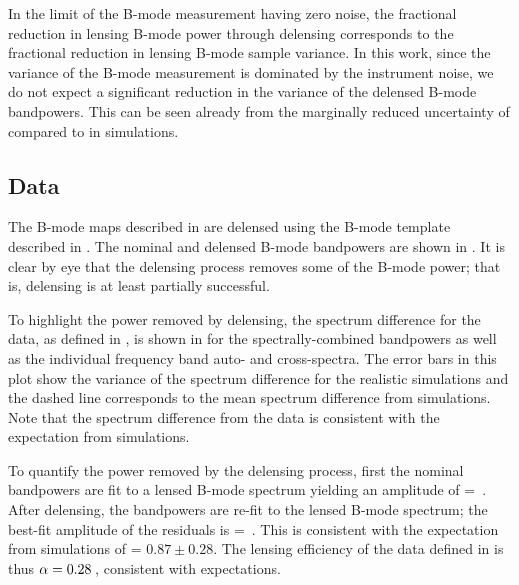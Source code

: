 In the limit of the B-mode measurement having zero noise, the fractional reduction in lensing B-mode power through delensing corresponds to the fractional reduction in lensing B-mode sample variance.
In this work, since the variance of the B-mode measurement is dominated by the instrument noise, we do not expect a significant reduction in the variance of the delensed B-mode bandpowers.
This can be seen already from the marginally reduced uncertainty of \Ares compared to \Alens in simulations.


\subsection{Data}
\label{sec:res-data}


The \sptpol B-mode maps described in  are delensed using the B-mode template described in .
The nominal and delensed B-mode bandpowers are shown in .
It is clear by eye that the delensing process removes some of the B-mode power; that is, delensing is at least partially successful.

To highlight the power removed by delensing, the spectrum difference for the data, as defined in , is shown in  for the spectrally-combined bandpowers as well as the individual frequency band auto- and cross-spectra.
The error bars in this plot show the variance of the spectrum difference for the realistic simulations and the dashed line corresponds to the mean spectrum difference from simulations.
Note that the spectrum difference from the data is consistent with the expectation from simulations.


To quantify the power removed by the delensing process, first the nominal bandpowers are fit to a lensed B-mode spectrum yielding an amplitude of
\beq
  \Alens = \AlensNom \,.
\eeq
After delensing, the bandpowers are re-fit to the lensed B-mode spectrum; the best-fit amplitude of the residuals is
\beq
  \Ares = \AlensDel \,.
\eeq
This is consistent with the expectation from simulations of \Ares = $0.87 \pm 0.28$.
The lensing efficiency of the data defined in  is thus $\alpha = 0.28\,$, consistent with expectations.

